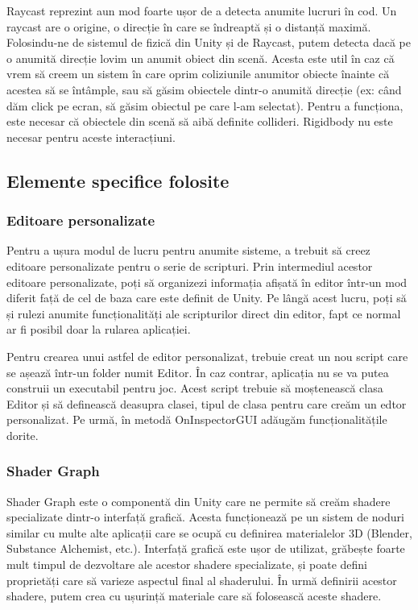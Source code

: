 \documentclass[12pt, a4paper]{article}
\begin{document}
	Raycast reprezint aun mod foarte ușor de a detecta anumite lucruri în cod. Un raycast are o origine, o direcție în care se îndreaptă și o distanță maximă. Folosindu-ne de sistemul de fizică din Unity și de Raycast, putem detecta dacă pe o anumită direcție lovim un anumit obiect din scenă. Acesta este util în caz că vrem să creem un sistem în care oprim coliziunile anumitor obiecte înainte că acestea să se întâmple, sau să găsim obiectele dintr-o anumită direcție (ex: când dăm click pe ecran, să găsim obiectul pe care l-am selectat). Pentru a funcționa, este necesar că obiectele din scenă să aibă definite collideri. Rigidbody nu este necesar pentru aceste interacțiuni.
	
	
	
	
	\subsection{Elemente specifice folosite}
	\label{section: specificElements}	
	
	\subsubsection{Editoare personalizate}
	
	Pentru a ușura modul de lucru pentru anumite sisteme, a trebuit să creez editoare personalizate pentru o serie de scripturi. Prin intermediul acestor editoare personalizate, poți să organizezi informația afișată în editor într-un mod diferit față de cel de baza care este definit de Unity. Pe lângă acest lucru, poți să și rulezi anumite funcționalități ale scripturilor direct din editor, fapt ce normal ar fi posibil doar la rularea aplicației.
	\newline
	
	Pentru crearea unui astfel de editor personalizat, trebuie creat un nou script care se așează într-un folder numit Editor. În caz contrar, aplicația nu se va putea construii un executabil pentru joc. Acest script trebuie să moștenească clasa Editor și să definească deasupra clasei, tipul de clasa pentru care creăm un edtor personalizat. Pe urmă, în metodă OnInspectorGUI adăugăm funcționalitățile dorite.
	
	
	
	
	
	\subsubsection{Shader Graph}
	
	Shader Graph este o componentă din Unity care ne permite să creăm shadere specializate dintr-o interfață grafică. Acesta funcționează pe un sistem de noduri similar cu multe alte aplicații care se ocupă cu definirea materialelor 3D (Blender, Substance Alchemist, etc.). Interfață grafică este ușor de utilizat, grăbește foarte mult timpul de dezvoltare ale acestor shadere specializate, și poate defini proprietăți care să varieze aspectul final al shaderului. În urmă definirii acestor shadere, putem crea cu ușurință materiale care să folosească aceste shadere.
	
\end{document}
